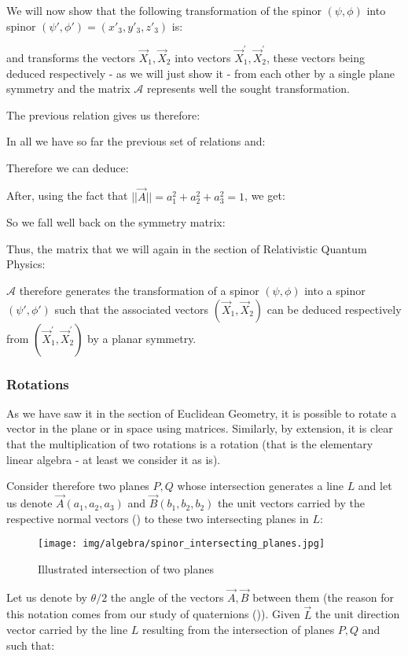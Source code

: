 	\begin{theorem}
	We will now show that the following transformation of the spinor $(\psi,\phi)$ into spinor $(\psi',\phi')=(x'_3,y'_3,z'_3)$ is:
	
	\end{theorem}
	and transforms the vectors $\vec{X}_1,\vec{X}_2$ into vectors $\vec{X}_1^{'},\vec{X}_2^{'}$, these vectors being deduced respectively - as we will just show it - from each other by a single plane symmetry and the matrix $\mathcal{A}$ represents well the sought transformation.
	
	The previous relation gives us therefore:
	
	In all we have so far the previous set of relations and:
	
	Therefore we can deduce:
	
	After, using the fact that $||\vec{A}||=a_1^2+a_2^2+a_3^2=1$, we get:
	
	So we fall well back on the symmetry matrix:
	
	Thus, the matrix that we will again in the section of Relativistic Quantum Physics:
	
	$\mathcal{A}$ therefore generates the transformation of a spinor $(\psi,\phi)$ into a spinor $(\psi',\phi')$ such that the associated vectors $(\vec{X}_1,\vec{X}_2)$ can be deduced respectively from $(\vec{X}_1^{'},\vec{X}_2^{'})$  by a planar symmetry.
	
	\subsubsection{Rotations}
	As we have saw it in the section of Euclidean Geometry, it is possible to rotate a vector in the plane or in space using matrices. Similarly, by extension, it is clear that the multiplication of two rotations is a rotation (that is the elementary linear algebra - at least we consider it as is).
	
	Consider therefore two planes $P, Q$ whose intersection generates a line $L$ and let us denote $\vec{A}(a_1,a_2,a_3)$ and $\vec{B}(b_1,b_2,b_2)$ the unit vectors carried by the respective normal vectors () to these two intersecting planes in $L$:
	\begin{figure}[H]
		\centering
		\texttt{[image: img/algebra/spinor\_intersecting\_planes.jpg]}
		\caption[]{Illustrated intersection of two planes}
	\end{figure}
	Let us denote by $\theta/2$ the angle of the vectors $\vec{A},\vec{B}$ between them (the reason for this notation comes from our study of quaternions ()). Given $\vec{L}$ the unit direction vector carried by the line $L$ resulting from the intersection of planes $P, Q$ and such that:
	
